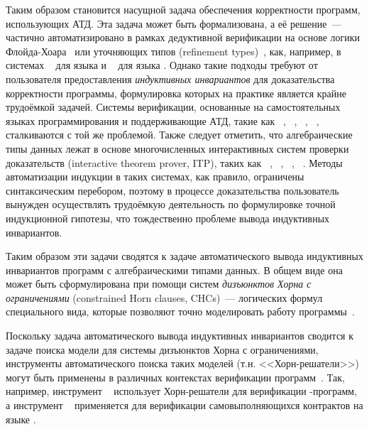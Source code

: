 Таким образом становится насущной задача обеспечения корректности программ, использующих  АТД.
Эта задача может быть формализована, а её решение~--- частично автоматизировано в рамках дедуктивной верификации на основе логики Флойда-Хоара~\cite{Floyd1993,10.1145/363235.363259} или уточняющих типов (refinement types)~\cite{713327}, как, например, в системах \flux{}~\cite{https://doi.org/10.48550/arxiv.2207.04034} для языка \rust{} и \leon{}~\cite{10.1007/978-3-642-23702-7_23} для языка \scala{}.
Однако такие подходы  требуют от пользователя предоставления \emph{индуктивных инвариантов} для доказательства корректности программы, формулировка которых на практике является крайне трудоёмкой задачей. Системы верификации, основанные на самостоятельных языках программирования и поддерживающие АТД, такие как \dafny{}~\cite{10.1007/978-3-642-17511-4_20}, \whyThree{}~\cite{10.1007/978-3-642-37036-6_8}, \viper{}~\cite{10.1007/978-3-662-49122-5_2}, \fstar{}~\cite{10.1145/2914770.2837655}, сталкиваются с той же проблемой.
Также следует отметить, что алгебраические типы данных лежат в основе многочисленных интерактивных систем проверки доказательств (interactive theorem prover, ITP), таких как \coq{}~\cite{barras1999coq}, \idris{}~\cite{brady_2013}, \agda{}~\cite{10.1145/3341691}, \lean{}~\cite{10.1007/978-3-030-79876-5_37}.
Методы автоматизации индукции в таких системах, как правило, ограничены синтаксическим перебором, поэтому в процессе доказательства пользователь вынужден осуществлять трудоёмкую деятельность  по формулировке точной индукционной гипотезы, что тождественно проблеме вывода индуктивных инвариантов.

Таким образом эти задачи сводятся к задаче автоматического вывода индуктивных инвариантов программ с алгебраическими типами данных. В общем виде она может быть сформулирована при помощи систем \emph{дизъюнктов Хорна с ограничениями} (constrained Horn clauses, CHCs)~--- логических формул специального вида, которые позволяют точно моделировать работу программы~\cite{MAKOWSKY1987266}.

Поскольку задача автоматического вывода индуктивных инвариантов сводится к задаче поиска модели для системы дизъюнктов Хорна с ограничениями, инструменты автоматического поиска таких моделей (т.\:н. <<Хорн-решатели>>) могут быть применены в различных контекстах верификации программ~\cite{10.1145/2254064.2254112,Bjorner2015}.
Так, например, инструмент \rustHorn{}~\cite{10.1145/3462205} использует Хорн-решатели для верификации \rust{}-программ, а инструмент \solCMC{}~\cite{10.1007/978-3-031-13185-1_16} применяется для верификации самовыполняющихся контрактов на языке \solidity{}.

